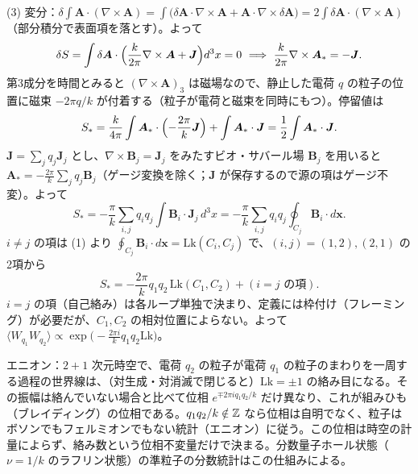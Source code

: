 \begin{solution}
(3) 変分：$\delta\int\bm A\cdot(\nabla\times\bm A)=\int\bigl(\delta\bm A\cdot\nabla\times\bm A+\bm A\cdot\nabla\times\delta\bm A\bigr)=2\int\delta\bm A\cdot(\nabla\times\bm A)$（部分積分で表面項を落とす）。よって
\[
\delta S=\int\delta\bm A\cdot\Bigl(\frac k{2\pi}\nabla\times\bm A+\bm J\Bigr)d^3x=0\ \Longrightarrow\ \frac k{2\pi}\nabla\times\bm A_*=-\bm J .
\]
第3成分を時間とみると $(\nabla\times\bm A)_3$ は磁場なので、静止した電荷 $q$ の粒子の位置に磁束 $-2\pi q/k$ が付着する（粒子が電荷と磁束を同時にもつ）。停留値は
\[
S_*=\frac k{4\pi}\int\bm A_*\cdot\Bigl(-\frac{2\pi}k\bm J\Bigr)+\int\bm A_*\cdot\bm J=\frac12\int\bm A_*\cdot\bm J .
\]
$\bm J=\sum_jq_j\bm J_j$ とし、$\nabla\times\bm B_j=\bm J_j$ をみたすビオ・サバール場 $\bm B_j$ を用いると $\bm A_*=-\frac{2\pi}k\sum_jq_j\bm B_j$（ゲージ変換を除く；$\bm J$ が保存するので源の項はゲージ不変）。よって
\[
S_*=-\frac\pi k\sum_{i,j}q_iq_j\int\bm B_i\cdot\bm J_j\,d^3x=-\frac\pi k\sum_{i,j}q_iq_j\oint_{C_j}\bm B_i\cdot d\bm x .
\]
$i\neq j$ の項は (1) より $\oint_{C_j}\bm B_i\cdot d\bm x=\mathrm{Lk}(C_i,C_j)$ で、$(i,j)=(1,2),(2,1)$ の2項から
\[
S_*=-\frac{2\pi}kq_1q_2\,\mathrm{Lk}(C_1,C_2)+(\text{$i=j$ の項}).
\]
$i=j$ の項（自己絡み）は各ループ単独で決まり、定義には枠付け（フレーミング）が必要だが、$C_1,C_2$ の相対位置によらない。よって $\langle W_{q_1}W_{q_2}\rangle\propto\exp\bigl(-\frac{2\pi i}kq_1q_2\mathrm{Lk}\bigr)$。

エニオン：$2+1$ 次元時空で、電荷 $q_2$ の粒子が電荷 $q_1$ の粒子のまわりを一周する過程の世界線は、（対生成・対消滅で閉じると）$\mathrm{Lk}=\pm1$ の絡み目になる。その振幅は絡んでいない場合と比べて位相 $e^{\mp2\pi iq_1q_2/k}$ だけ異なり、これが組みひも（ブレイディング）の位相である。$q_1q_2/k\notin\mathbb{Z}$ なら位相は自明でなく、粒子はボソンでもフェルミオンでもない統計（エニオン）に従う。この位相は時空の計量によらず、絡み数という位相不変量だけで決まる。分数量子ホール状態（$\nu=1/k$ のラフリン状態）の準粒子の分数統計はこの仕組みによる。
\end{solution}
